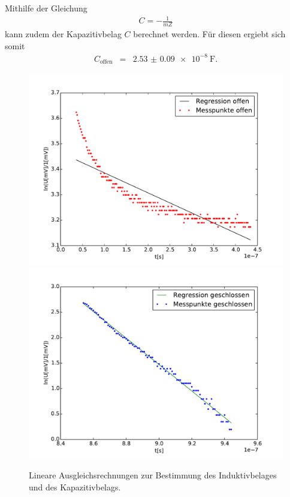 Mithilfe der Gleichung
\begin{eqnarray}
	C = -\frac{1}{mZ}
\end{eqnarray}
kann zudem der Kapazitivbelag $C$ berechnet werden.
Für diesen ergiebt sich somit
\begin{eqnarray}
	C_\text{offen} &=& \SI{2.53(9)e-8}{\farad}.
\end{eqnarray}

\begin{figure}
	\centering
	\includegraphics[width = 14cm]{data/c/Regression1.pdf}
	\includegraphics[width = 14cm]{data/c/Regression2.pdf}
	\caption{Lineare Ausgleichsrechnungen zur Bestimmung des Induktivbelages und des Kapazitivbelags.}
	\label{fig_fit1}
\end{figure}

